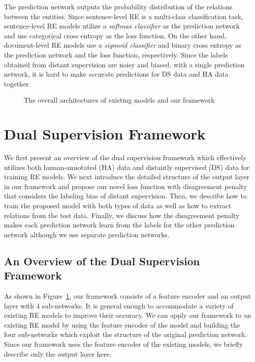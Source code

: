 \documentclass[11pt]{article}
\renewcommand{\figurename}{Figure}
\begin{document}
The prediction network outputs the probability distribution of the relations between the entities.
Since sentence-level RE is a multi-class classification task, sentence-level RE models \cite{cai2016bidirectional,zeng2014relation,zeng2015distant} utilize a \emph{softmax classifier} as the prediction network and use categorical cross entropy as the loss function.
On the other hand, document-level RE models \cite{yao2019docred,wang2019fine} use a \emph{sigmoid classifier} and binary cross entropy as the prediction network and the loss function, respectively.
Since the labels obtained from distant supervision are noisy and biased,
with a single prediction network, it is hard to make accurate predictions for DS data and HA data together.


\begin{figure}[tb]
	\hspace{0.03in}
	\vspace{-0.05in}
	\caption{The overall architectures of existing models and our framework}
	\label{fig:architecture}
	\vspace{-0.03in}
\end{figure}

 


\section{Dual Supervision Framework}
We first present an overview of the dual supervision framework which effectively utilizes both human-annotated (HA) data and distantly supervised (DS) data for training RE models.
We next introduce the detailed structure of the output layer in our framework and propose our novel loss function with disagreement penalty that considers the labeling bias of distant supervision.
Then, we describe how to train the proposed model with both types of data as well as how to extract relations from the test data.
Finally, we discuss how the disagreement penalty makes each prediction network learn from the labels for the other prediction network although we use separate prediction networks.

\subsection{An Overview of the Dual Supervision Framework}
As shown in \figurename~\ref{fig:architecture}, our framework consists of a feature encoder and an output layer with 4 sub-networks.
It is general enough to accommodate a variety of existing RE models to improve their accuracy.
We can apply our framework to an existing RE model by using the feature encoder of the model and building the four sub-networks which exploit the structure of the original prediction network.
Since our framework uses the feature encoder of the existing models, we briefly describe only the output layer here.
\end{document}
